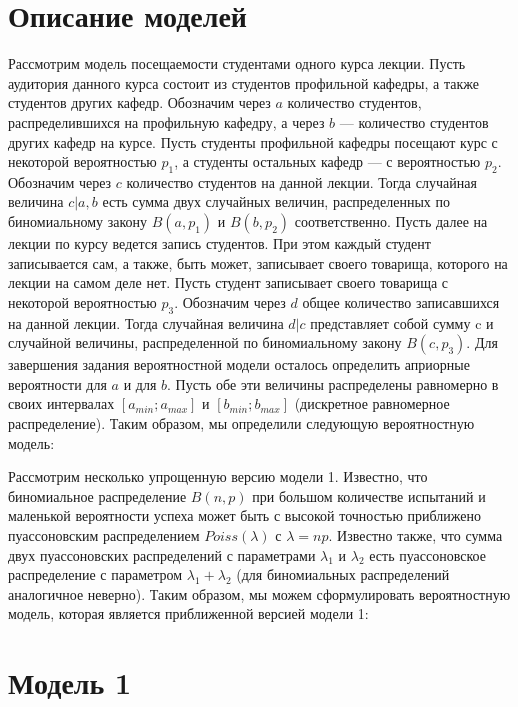 \documentclass[12pt,a4paper,oneside,fleqn,leqno]{article}
\begin{document}
	\section{Описание моделей}
		Рассмотрим модель посещаемости студентами одного курса лекции. Пусть аудитория данного курса состоит из студентов профильной кафедры, а также студентов других кафедр. Обозначим через $a$ количество студентов, распределившихся на профильную кафедру, а через $b$ --- количество студентов других кафедр на курсе. Пусть студенты профильной кафедры посещают курс с некоторой вероятностью $p_1$, а студенты остальных кафедр --- с вероятностью $p_2$. Обозначим через $c$ количество студентов на данной лекции. Тогда случайная величина $c|a,b$ есть сумма двух случайных величин, распределенных по биномиальному закону $B(a,p_1)$ и $B(b,p_2)$ соответственно. Пусть далее на лекции по курсу ведется запись студентов. При этом каждый студент записывается сам, а также, быть может, записывает своего товарища, которого на лекции на самом деле нет. Пусть студент записывает своего товарища с некоторой вероятностью $p_3$. Обозначим через $d$ общее количество записавшихся на данной лекции. Тогда случайная величина $d|c$ представляет собой сумму c и случайной величины, распределенной по биномиальному закону $B(c,p_3)$. Для завершения задания вероятностной модели осталось определить априорные вероятности для $a$ и для $b$. Пусть обе эти величины распределены равномерно в своих интервалах $[a_{min}; a_{max}]$ и $[b_{min}; b_{max}]$ (дискретное равномерное распределение). Таким образом, мы определили следующую вероятностную модель: \par
		Рассмотрим несколько упрощенную версию модели 1. Известно, что биномиальное распределение $B(n,p)$ при большом количестве испытаний и маленькой вероятности успеха может быть с высокой точностью приближено пуассоновским распределением $Poiss(\lambda)$ с $\lambda = np$. Известно также, что сумма двух пуассоновских распределений с параметрами $\lambda_1$ и $\lambda_2$ есть пуассоновское распределение с параметром $\lambda_1+\lambda_2$ (для биномиальных распределений аналогичное неверно). Таким образом, мы можем сформулировать вероятностную модель, которая является приближенной версией модели 1:
	
	\section{Модель 1}
\end{document}

